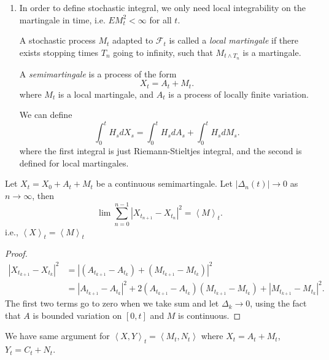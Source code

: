 \begin{remark}
	\begin{enumerate}
		\item In order to define stochastic integral, we only need local integrability on the martingale in time, i.e. $E M_t^2 < \infty $ for all $t$.

\begin{definition}
	A stochastic process $M_t$ adapted to $\mathcal{F}_t$ is called a \textit{local martingale} if there exists stopping times $T_n$ going to infinity, such that $M_{t \wedge T_n}$ is a martingale.
\end{definition}

\begin{definition}[Semimartingale]
	A \textit{semimartingale} is a process of the form
	\[
		X_t = A_t + M_t
	.\] 
	where $M_t$ is a local martingale, and $A_t$ is a process of locally finite variation. 
\end{definition}
	We can define
	\[
		\int _0^t H_s d X_s = \int _0^t H_s d A_s + \int _0^t H_s d M_s
	.\] 
	where the first integral is just Riemann-Stieltjes integral, and the second is defined for local martingales.
	\end{enumerate}
\end{remark}

\begin{lemma}
	Let $X_t = X_0 + A_t + M_t$ be a continuous semimartingale. Let $\left| \Delta_n(t) \right|  \to  0$ as $n \to \infty $, then
	\[
		\lim \sum_{n=0}^{n-1} \left| X_{t_{n+1}} - X_{t_n} \right| ^2 = \left\langle M \right\rangle _t
	.\] 
	i.e., $\left\langle X \right\rangle _t = \left\langle M \right\rangle _t$
\end{lemma}
\begin{proof}
	\begin{align*}
		\left| X_{t_{k+1}} - X_{t_k} \right| ^2
		&= \left| (A_{t_{k+1}} - A_{t_k})+(M_{t_{k+1}} - M_{t_k}) \right|^2  \\
		&= \left| A_{t_{k+1}} - A_{t_k}\right|^2
		+ 2(A_{t_{k+1}} - A_{t_k}) (M_{t_{k+1}} - M_{t_k})
		+ \left| M_{t_{k+1}} - M_{t_k}\right|^2  
	.\end{align*}
	The first two terms go to zero when we take sum and let $\Delta_k \to 0 $, using the fact that $A$ is bounded variation on $[0,t]$ and $M$ is continuous.
\end{proof}
\begin{remark}
	We have same argument for $\left\langle X, Y \right\rangle _t = \left\langle M_t, N_t \right\rangle $ where $X_t = A_t + M_t$, $Y_t = C_t + N_t$.
\end{remark}

